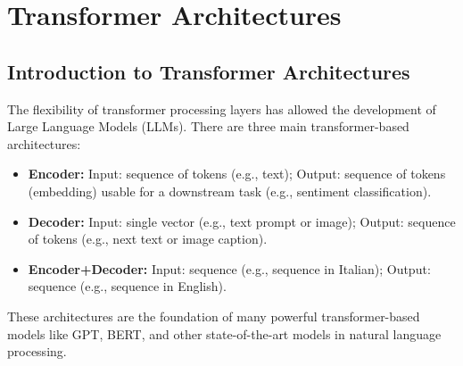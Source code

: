 \documentclass[11pt,a4paper]{article}
\theoremstyle{definition}
\theoremstyle{plain}
\theoremstyle{remark}
\begin{document}
\section{Transformer Architectures}

\subsection{Introduction to Transformer Architectures}

The flexibility of transformer processing layers has allowed the development of Large Language Models (LLMs). There are three main transformer-based architectures:
\begin{itemize}
    \item \textbf{Encoder:} Input: sequence of tokens (e.g., text); Output: sequence of tokens (embedding) usable for a downstream task (e.g., sentiment classification).
    \item \textbf{Decoder:} Input: single vector (e.g., text prompt or image); Output: sequence of tokens (e.g., next text or image caption).
    \item \textbf{Encoder+Decoder:} Input: sequence (e.g., sequence in Italian); Output: sequence (e.g., sequence in English).
\end{itemize}

These architectures are the foundation of many powerful transformer-based models like GPT, BERT, and other state-of-the-art models in natural language processing.
\end{document}
